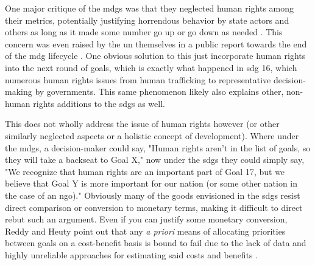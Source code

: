 One major critique of the \acp{mdg} was that they neglected human rights among their metrics, potentially justifying horrendous behavior by state actors and others as long as it made some number go up or go down as needed \cite{alstonShipsPassingNight2005}. This concern was even raised by the \ac{un} themselves in a public report towards the end of the \ac{mdg} lifecycle \cite{officeoftheunitednationshighcommissionerforhumanrightsWhoWillBe2013}. One obvious solution to this just incorporate human rights into the next round of goals, which is exactly what happened in \ac{sdg} 16, which numerous human rights issues from human trafficking to representative decision-making by governments. This same phenomenon likely also explains other, non-human rights additions to the \acp{sdg} as well.

This does not wholly address the issue of human rights however (or other similarly neglected aspects or a holistic concept of development). Where under the \acp{mdg}, a decision-maker could say, "Human rights aren't in the list of goals, so they will take a backseat to Goal X," now under the \acp{sdg} they could simply say, "We recognize that human rights are an important part of Goal 17, but we believe that Goal Y is more important for our nation (or some other nation in the case of an \ac{ngo})." Obviously many of the goods envisioned in the \acp{sdg} resist direct comparison or conversion to monetary terms, making it difficult to direct rebut such an argument. Even if you can justify some monetary conversion, Reddy and Heuty point out that any \textit{a priori} means of allocating priorities between goals on a cost-benefit basis is bound to fail due to the lack of data and highly unreliable approaches for estimating said costs and benefits \cite{reddyGlobalDevelopmentGoals2008}.

